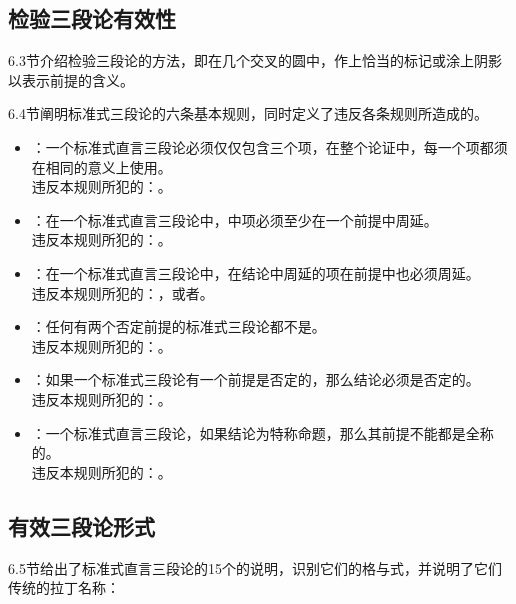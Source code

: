 \subsection{检验三段论有效性}
6.3节介绍检验三段论的方法，即在几个交叉的圆中，作上恰当的标记或涂上阴影以表示前提的含义。

6.4节阐明标准式三段论的六条基本规则，同时定义了违反各条规则所造成的。

\begin{itemize}
\item {}：一个标准式直言三段论必须仅仅包含三个项，在整个论证中，每一个项都须在相同的意义上使用。\\
违反本规则所犯的：。

\item {}：在一个标准式直言三段论中，中项必须至少在一个前提中周延。\\
违反本规则所犯的：。

\item {}：在一个标准式直言三段论中，在结论中周延的项在前提中也必须周延。\\
违反本规则所犯的：，或者。

\item {}：任何有两个否定前提的标准式三段论都不是。\\
违反本规则所犯的：。

\item {}：如果一个标准式三段论有一个前提是否定的，那么结论必须是否定的。\\
违反本规则所犯的：。

\item {}：一个标准式直言三段论，如果结论为特称命题，那么其前提不能都是全称的。\\
违反本规则所犯的：。
\end{itemize}

\subsection{有效三段论形式}
6.5节给出了标准式直言三段论的15个的说明，识别它们的格与式，并说明了它们传统的拉丁名称：

